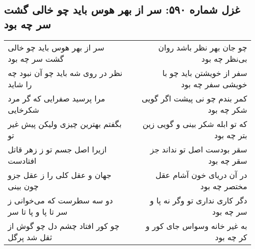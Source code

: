\begin{center}
\section*{غزل شماره ۵۹۰: سر از بهر هوس باید چو خالی گشت سر چه بود}
\label{sec:0590}
\begin{longtable}{l p{0.5cm} r}
سر از بهر هوس باید چو خالی گشت سر چه بود
&&
چو جان بهر نظر باشد روان بی‌نظر چه بود
\\
نظر در روی شه باید چو آن نبود چه را شاید
&&
سفر از خویشتن باید چو با خویشی سفر چه بود
\\
مرا پرسید صفرایی که گر مرد شکرخایی
&&
کمر بندم چو نی پیشت اگر گویی شکر چه بود
\\
بگفتم بهترین چیزی ولیکن پیش غیر تو
&&
که تو ابله شکر بینی و گویی زین بتر چه بود
\\
ازیرا اصل جسم تو ز زهر قاتل افتادست
&&
سقر بودست اصل تو نداند جز سقر چه بود
\\
جهان و عقل کلی را ز عقل جزو چون بینی
&&
در آن دریای خون آشام عقل مختصر چه بود
\\
دو سه سطرست که می‌خوانی ز سر تا پا و پا تا سر
&&
دگر کاری نداری تو وگر نه پا و سر چه بود
\\
چو کور افتاد چشم دل چو گوش از ثقل شد پرگل
&&
به غیر خانه وسواس جای کور و کر چه بود
\\
\end{longtable}
\end{center}
